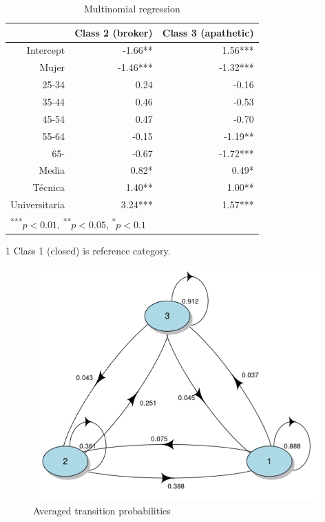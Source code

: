 \begin{table}[H]
\centering
\begin{threeparttable}
\caption{\label{demo-table} Multinomial regression}
\begin{tabular}{rrr}
  \hline
 & Class 2 (broker) & Class 3 (apathetic)\\ 
  \hline
Intercept & -1.66** & 1.56*** \\ 
  Mujer & -1.46*** & -1.32*** \\ 
  25-34 & 0.24 & -0.16 \\ 
  35-44 & 0.46 & -0.53 \\ 
  45-54 & 0.47 & -0.70 \\ 
  55-64 & -0.15 & -1.19** \\ 
  65- & -0.67 & -1.72*** \\ 
  Media & 0.82* & 0.49* \\ 
  Técnica & 1.40** & 1.00** \\ 
  Universitaria & 3.24*** & 1.57*** \\ 
   \hline
\multicolumn{3}{l}{\textsuperscript{***}$p<0.01$, 
  \textsuperscript{**}$p<0.05$, 
  \textsuperscript{*}$p<0.1$}
\end{tabular}
\begin{tablenotes}
    \item[1] Class 1 (closed) is reference category.
  \end{tablenotes}
\end{threeparttable}
\end{table}

\begin{figure}[htp]
    \centering
    \includegraphics[width=11cm]{output/plot_transition.png}
    \caption{Averaged transition probabilities}
    \label{fig:galaxy}
\end{figure}


